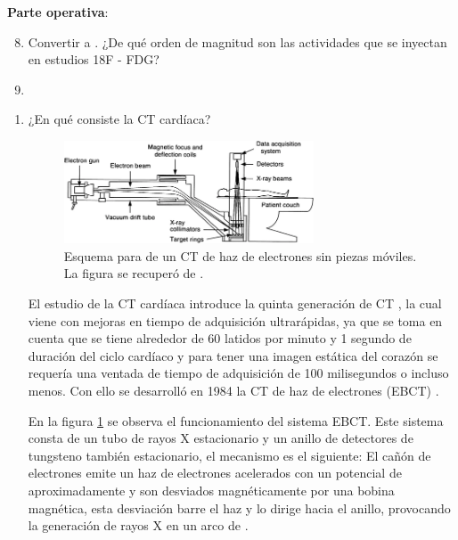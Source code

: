 \textbf{Parte operativa}:

\begin{enumerate}[1.]
  \setcounter{enumi}{7}
  \item  Convertir  a . ¿De qué orden de magnitud son las actividades que se inyectan en  estudios 18F - FDG?
  \item 
\end{enumerate}


\pagebreak









\begin{enumerate}[1.]
\item ¿En qué consiste la CT cardíaca?



\begin{figure}[!ht]
\centering
\includegraphics[width=0.7\textwidth]{./figuras/40134_2012_5_Fig13_HTML.png}
\caption{Esquema para de un CT de haz de electrones sin piezas móviles. La figura se recuperó de \citep{Flohr}.}
\label{p1:ct}
\end{figure}

El estudio de la CT cardíaca introduce la quinta generación de CT \citep{IM}, la cual viene con mejoras en tiempo de adquisición ultrarápidas, ya que se toma en cuenta que se tiene alrededor de 60 latidos por minuto y 1 segundo de duración del ciclo cardíaco y para tener una imagen estática del corazón se requería una ventada de tiempo de adquisición de 100 milisegundos o incluso menos. Con ello se desarrolló en 1984 la CT de haz de electrones (EBCT)  \citep{jerro}.


En la figura \ref{p1:ct} se observa el funcionamiento del sistema EBCT. Este sistema consta de un tubo de rayos X estacionario y un anillo de detectores de tungsteno también estacionario, el mecanismo es el siguiente: El cañón de electrones emite un haz de electrones acelerados con un potencial de aproximadamente   y son desviados magnéticamente por una bobina magnética, esta desviación barre el haz y lo dirige hacia el anillo, provocando la generación de rayos X en un arco de   \citep{Flohr,jerro}. 



\end{enumerate}
